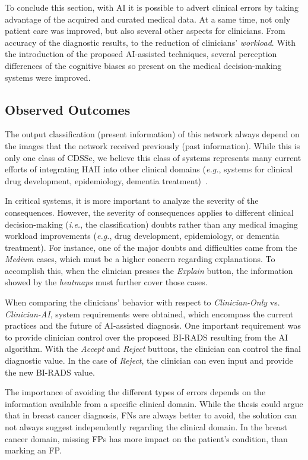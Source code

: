To conclude this section, with \ac{AI} it is possible to advert clinical errors by taking advantage of the acquired and curated medical data.
At a same time, not only patient care was improved, but also several other aspects for clinicians.
From accuracy of the diagnostic results, to the reduction of clinicians' {\it workload}.
With the introduction of the proposed \ac{AI}-assisted techniques, several perception differences of the cognitive biases so present on the medical decision-making systems were improved.

\subsection{Observed Outcomes}
\label{sec:app003005003}

The output classification (present information) of this network always depend on the images that the network received previously (past information).
While this is only one class of \ac{CDSSe}, we believe this class of systems represents many current efforts of integrating \ac{HAII} into other clinical domains ({\it e.g.}, systems for clinical drug development, epidemiology, dementia treatment)~\cite{Savage2019, shah2019artificial, topol2019high}.

In critical systems, it is more important to analyze the severity of the consequences.
However, the severity of consequences applies to different clinical decision-making ({\it i.e.}, the classification) doubts rather than any medical imaging workload improvements ({\it e.g.}, drug development, epidemiology, or dementia treatment).
For instance, one of the major doubts and difficulties came from the {\it Medium} cases, which must be a higher concern regarding explanations.
To accomplish this, when the clinician presses the {\it Explain} button, the information showed by the {\it heatmaps} must further cover those cases.

When comparing the clinicians' behavior with respect to {\it Clinician-Only} vs. {\it Clinician-AI}, system requirements were obtained, which encompass the current practices and the future of \ac{AI}-assisted diagnosis.
One important requirement was to provide clinician control over the proposed \ac{BI-RADS} resulting from the \ac{AI} algorithm.
With the {\it Accept} and {\it Reject} buttons, the clinician can control the final diagnostic value.
In the case of {\it Reject}, the clinician can even input and provide the new \ac{BI-RADS} value.

The importance of avoiding the different types of errors depends on the information available from a specific clinical domain.
While the thesis could argue that in breast cancer diagnosis, \acp{FN} are always better to avoid, the solution can not always suggest independently regarding the clinical domain.
In the breast cancer domain, missing \acp{FP} has more impact on the patient's condition, than marking an \ac{FP}.

